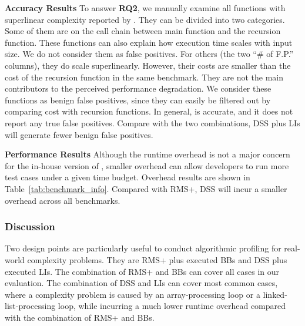 \textbf{Accuracy Results}
To answer {\bf RQ2},
we manually examine all functions with superlinear complexity reported by \Tool.
They can be divided into two categories. 
Some of them are on the call chain between main function and the recursion function.
These functions can also explain how execution time scales with input size. 
We do not consider them as false positives. 
For others (the two ``\# of F.P.'' columns), they do scale superlinearly. 
However, their costs are smaller than the cost of 
the recursion function in the same benchmark. 
They are not the main contributors to the perceived performance degradation. 
We consider these functions as benign false positives, 
since they can easily be filtered out 
by comparing cost with recursion functions. 
In general, \Tool is accurate, and it does not report any true false positives. 
Compare with the two combinations, DSS plus 
LIs will generate fewer benign false positives. 

\textbf{Performance Results}
Although the runtime overhead is not a major concern 
for the in-house version of \Tool, 
smaller overhead can allow developers to run 
more test cases under a given time budget. 
Overhead results are shown in Table~\ref{tab:benchmark_info}. 
Compared with RMS+, DSS will incur a smaller overhead across all benchmarks. 


\subsubsection{Discussion} 
Two design points are particularly useful 
to conduct algorithmic profiling for real-world complexity problems.
They are RMS+ plus executed BBs and DSS plus executed LIs. 
The combination of RMS+ and BBs can cover all cases in our evaluation. 
The combination of DSS and LIs can cover most common cases, 
where a complexity problem is caused by an array-processing loop or a linked-list-processing loop, 
while incurring a much lower runtime overhead compared with the combination of RMS+ and BBs. 

